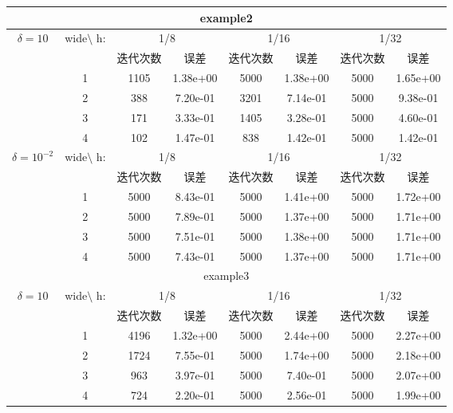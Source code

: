\documentclass[11pt]{article}
\begin{document}
\begin{table}[ht!]
\begin{tabular}{  c| c|c c|c c| c c }
      \hline      
  \hline
  
\hline



    \hline     
    \hline
    \multicolumn{8}{c}{example2}\\
         \hline      
  \hline
  
\hline



    \hline     
    \hline
    \multirow{6}{*}{$\delta=10$}
   &wide$\setminus$  h:	&\multicolumn{2}{|c|}{1/8}&\multicolumn{2}{|c|}{1/16}&\multicolumn{2}{|c}{1/32}\\
&	&迭代次数	&误差	&迭代次数	&误差  &迭代次数	&误差		\\
&1&1105	&1.38e+00	&5000	&1.38e+00	&5000	&1.65e+00\\
&2&388	&7.20e-01	&3201	&7.14e-01	&5000	&9.38e-01\\
&3&171	&3.33e-01	&1405	&3.28e-01	&5000	&4.60e-01\\
&4&102	&1.47e-01	&838	&1.42e-01	&5000	&1.42e-01\\
    \cline{1-8}     	
      \multirow{6}{*}{$\delta=10^{-2}$}
   &wide$\setminus$  h:	&\multicolumn{2}{|c|}{1/8}&\multicolumn{2}{|c|}{1/16}&\multicolumn{2}{|c}{1/32}\\ 
&	&迭代次数	&误差	&迭代次数	&误差  &迭代次数	&误差		\\ 

&1&5000	&8.43e-01	&5000	&1.41e+00	&5000	&1.72e+00\\
&2&5000	&7.89e-01	&5000	&1.37e+00	&5000	&1.71e+00\\
&3&5000	&7.51e-01	&5000	&1.38e+00	&5000	&1.71e+00\\
&4&5000	&7.43e-01	&5000	&1.37e+00	&5000	&1.71e+00\\

      \hline      
  \hline
  
\hline




    \hline     
    \hline
    \multicolumn{8}{c}{example3}\\
         \hline      
  \hline
  
\hline



    \hline     
    \hline
    \multirow{6}{*}{$\delta=10$}
   &wide$\setminus$  h:	&\multicolumn{2}{|c|}{1/8}&\multicolumn{2}{|c|}{1/16}&\multicolumn{2}{|c}{1/32}\\
&	&迭代次数	&误差	&迭代次数	&误差  &迭代次数	&误差		\\
&1&4196	&1.32e+00	&5000	&2.44e+00	&5000	&2.27e+00\\
&2&1724	&7.55e-01	&5000	&1.74e+00	&5000	&2.18e+00\\
&3&963	&3.97e-01	&5000	&7.40e-01	&5000	&2.07e+00\\
&4&724	&2.20e-01	&5000	&2.56e-01	&5000	&1.99e+00\\
 
      \hline      
  \hline
  
\hline


    \end{tabular}
\end{table}
\end{document}
